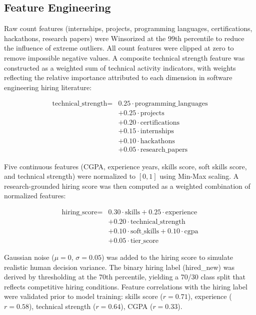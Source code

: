 \documentclass[conference]{IEEEtran}
\begin{document}
\subsection{Feature Engineering}

Raw count features (internships, projects, programming languages, certifications, hackathons, research papers) were Winsorized at the 99th percentile to reduce the influence of extreme outliers. All count features were clipped at zero to remove impossible negative values. A composite technical strength feature was constructed as a weighted sum of technical activity indicators, with weights reflecting the relative importance attributed to each dimension in software engineering hiring literature:

\begin{equation}
\begin{aligned}
\text{technical\_strength} = {} & 0.25\cdot\text{programming\_languages} \\
& + 0.25\cdot\text{projects} \\
& + 0.20\cdot\text{certifications} \\
& + 0.15\cdot\text{internships} \\
& + 0.10\cdot\text{hackathons} \\
& + 0.05\cdot\text{research\_papers}
\end{aligned}
\label{eq:techstrength}
\end{equation}

Five continuous features (CGPA, experience years, skills score, soft skills score, and technical strength) were normalized to $[0, 1]$ using Min-Max scaling. A research-grounded hiring score was then computed as a weighted combination of normalized features:

\begin{equation}
\begin{aligned}
\text{hiring\_score} = {} & 0.30\cdot\text{skills} + 0.25\cdot\text{experience} \\
& + 0.20\cdot\text{technical\_strength} \\
& + 0.10\cdot\text{soft\_skills} + 0.10\cdot\text{cgpa} \\
& + 0.05\cdot\text{tier\_score}
\end{aligned}
\label{eq:hiringscore}
\end{equation}

Gaussian noise ($\mu=0$, $\sigma=0.05$) was added to the hiring score to simulate realistic human decision variance. The binary hiring label (hired\_new) was derived by thresholding at the 70th percentile, yielding a 70/30 class split that reflects competitive hiring conditions. Feature correlations with the hiring label were validated prior to model training: skills score ($r = 0.71$), experience ($r = 0.58$), technical strength ($r = 0.64$), CGPA ($r = 0.33$).
\end{document}
